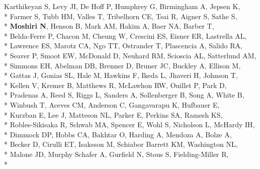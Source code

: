 \documentclass[margin,line]{res}
\begin{document}
\begin{resume}
\hspace*{4mm} Karthikeyan S, Levy JI, De Hoff P, Humphrey G, Birmingham A, Jepsen K,\\*
\hspace*{9.5mm} Farmer S, Tubb HM, Valles T, Tribelhorn CE, Tsai R, Aigner S, Sathe S,\\*
\hspace*{9.5mm} \textbf{Moshiri N}, Henson B, Mark AM, Hakim A, Baer NA, Barber T,\\*
\hspace*{9.5mm} Belda-Ferre P, Chacon M, Cheung W, Crescini ES, Eisner ER, Lastrella AL,\\*
\hspace*{9.5mm} Lawrence ES, Marotz CA, Ngo TT, Ostrander T, Plascencia A, Salido RA,\\*
\hspace*{9.5mm} Seaver P, Smoot EW, McDonald D, Neuhard RM, Scioscia AL, Satterlund AM,\\*
\hspace*{9.5mm} Simmons EH, Abelman DB, Brenner D, Bruner JC, Buckley A, Ellison M,\\*
\hspace*{9.5mm} Gattas J, Gonias SL, Hale M, Hawkins F, Ikeda L, Jhaveri H, Johnson T,\\*
\hspace*{9.5mm} Kellen V, Kremer B, Matthews R, McLawhon RW, Ouillet P, Park D,\\*
\hspace*{9.5mm} Pradenas A, Reed S, Riggs L, Sanders A, Sollenberger B, Song A, White B,\\*
\hspace*{9.5mm} Winbush T, Aceves CM, Anderson C, Gangavarapu K, Hufbauer E,\\*
\hspace*{9.5mm} Kurzban E, Lee J, Matteson NL, Parker E, Perkins SA, Ramesh KS,\\*
\hspace*{9.5mm} Robles-Sikisaka R, Schwab MA, Spencer E, Wohl S, Nicholson L, McHardy IH,\\*
\hspace*{9.5mm} Dimmock DP, Hobbs CA, Bakhtar O, Harding A, Mendoza A, Bolze A,\\*
\hspace*{9.5mm} Becker D, Cirulli ET, Isaksson M, Schiabor Barrett KM, Washington NL,\\*
\hspace*{9.5mm} Malone JD, Murphy Schafer A, Gurfield N, Stous S, Fielding-Miller R,\\*

\end{resume}
\end{document}
